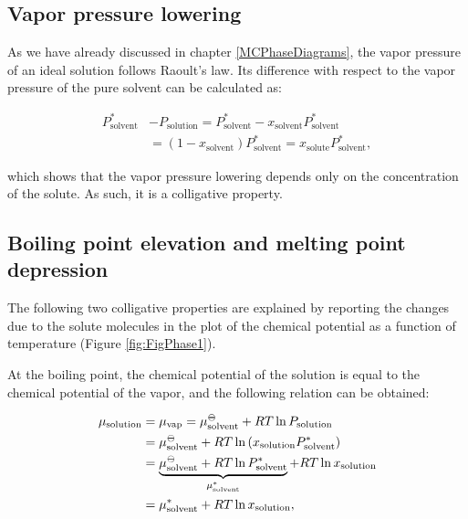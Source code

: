 \documentclass[
  9pt,
]{extbook}
\theoremstyle{definition}
\theoremstyle{definition}
\theoremstyle{definition}
\theoremstyle{remark}
\begin{document}
\hypertarget{vapor-pressure-lowering}{%
\subsection{Vapor pressure lowering}\label{vapor-pressure-lowering}}

As we have already discussed in chapter \ref{MCPhaseDiagrams}, the vapor pressure of an ideal solution follows Raoult's law. Its difference with respect to the vapor pressure of the pure solvent can be calculated as:

\begin{equation}
\begin{aligned}
P_{\text{solvent}}^* &- P_{\text{solution}} = P_{\text{solvent}}^* - x_{\text{solvent}} P_{\text{solvent}}^* \\ 
& = \left( 1-x_{\text{solvent}}\right)P_{\text{solvent}}^* =x_{\text{solute}} P_{\text{solvent}}^*,
\end{aligned}
\label{eq:coll2}
\end{equation}

which shows that the vapor pressure lowering depends only on the concentration of the solute. As such, it is a colligative property.

\hypertarget{boiling-point-elevation-and-melting-point-depression}{%
\subsection{Boiling point elevation and melting point depression}\label{boiling-point-elevation-and-melting-point-depression}}

The following two colligative properties are explained by reporting the changes due to the solute molecules in the plot of the chemical potential as a function of temperature (Figure \ref{fig:FigPhase1}).

At the boiling point, the chemical potential of the solution is equal to the chemical potential of the vapor, and the following relation can be obtained:

\begin{equation}
\begin{aligned}
\mu_{\text{solution}} &=\mu_{\text{vap}}=\mu_{\text{solvent}}^{{-\kern-6pt{\ominus}\kern-6pt-}} + RT \ln P_{\text{solution}} \\
&= \mu_{\text{solvent}}^{{-\kern-6pt{\ominus}\kern-6pt-}} + RT \ln \left(x_{\text{solution}} P_{\text{solvent}}^* \right)\\
&= \underbrace{\mu_{\text{solvent}}^{{-\kern-6pt{\ominus}\kern-6pt-}} + RT \ln P_{\text{solvent}}^*}_{\mu_{\text{solvent}}^*} + RT \ln x_{\text{solution}} \\
&= \mu_{\text{solvent}}^* + RT \ln x_{\text{solution}},
\end{aligned}
\label{eq:collA}
\end{equation}
\end{document}
